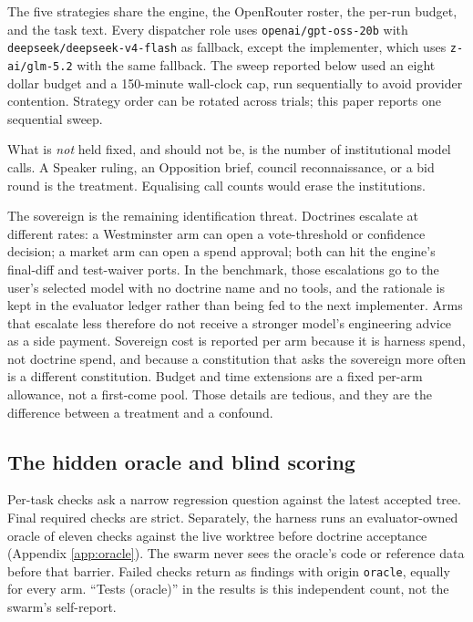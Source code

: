 \documentclass[11pt,a4paper]{article}
\begin{document}
The five strategies share the engine, the OpenRouter roster, the per-run budget, and the
task text. Every dispatcher role uses \texttt{openai/gpt-oss-20b} with
\texttt{deepseek/deepseek-v4-flash} as fallback, except the implementer, which uses
\texttt{z-ai/glm-5.2} with the same fallback. The sweep reported below used an eight
dollar budget and a 150-minute wall-clock cap, run sequentially to avoid provider
contention. Strategy order can be rotated across trials; this paper reports one
sequential sweep.

What is \emph{not} held fixed, and should not be, is the number of institutional model
calls. A Speaker ruling, an Opposition brief, council reconnaissance, or a bid round is
the treatment. Equalising call counts would erase the institutions.

The sovereign is the remaining identification threat. Doctrines escalate at different
rates: a Westminster arm can open a vote-threshold or confidence decision; a market arm
can open a spend approval; both can hit the engine's final-diff and test-waiver ports.
In the benchmark, those escalations go to the user's selected model with no doctrine
name and no tools, and the rationale is kept in the evaluator ledger rather than being
fed to the next implementer. Arms that escalate less therefore do not receive a stronger
model's engineering advice as a side payment. Sovereign cost is reported per arm
because it is harness spend, not doctrine spend, and because a constitution that asks
the sovereign more often is a different constitution. Budget and time extensions are a
fixed per-arm allowance, not a first-come pool. Those details are tedious, and they are
the difference between a treatment and a confound.

\subsection{The hidden oracle and blind scoring}

Per-task checks ask a narrow regression question against the latest accepted tree. Final
required checks are strict. Separately, the harness runs an evaluator-owned oracle of
eleven checks against the live worktree before doctrine acceptance (Appendix
\ref{app:oracle}). The swarm never sees the oracle's code or reference data before that
barrier. Failed checks return as findings with origin \texttt{oracle}, equally for every
arm. ``Tests (oracle)'' in the results is this independent count, not the swarm's
self-report.
\end{document}
